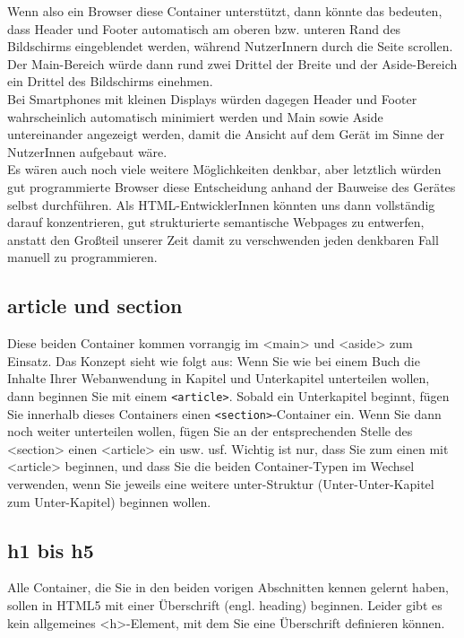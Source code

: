 Wenn also ein Browser diese Container unterstützt, dann könnte das bedeuten, dass Header und Footer automatisch am oberen bzw. unteren Rand des Bildschirms eingeblendet werden, während NutzerInnern durch die Seite scrollen. Der Main-Bereich würde dann rund zwei Drittel der Breite und der Aside-Bereich ein Drittel des Bildschirms einehmen.\\

Bei Smartphones mit kleinen Displays würden dagegen Header und Footer wahrscheinlich automatisch minimiert werden und Main sowie Aside untereinander angezeigt werden, damit die Ansicht auf dem Gerät im Sinne der NutzerInnen aufgebaut wäre.\\

Es wären auch noch viele weitere Möglichkeiten denkbar, aber letztlich würden gut programmierte Browser diese Entscheidung anhand der Bauweise des Gerätes selbst durchführen. Als HTML-EntwicklerInnen könnten uns dann vollständig darauf konzentrieren, gut strukturierte semantische Webpages zu entwerfen, anstatt den Großteil unserer Zeit damit zu verschwenden jeden denkbaren Fall manuell zu programmieren.

\subsection{article und section}

Diese beiden Container kommen vorrangig im <main> und <aside> zum Einsatz. Das Konzept sieht wie folgt aus: Wenn Sie wie bei einem Buch die Inhalte Ihrer Webanwendung in Kapitel und Unterkapitel unterteilen wollen, dann beginnen Sie mit einem \verb|<article>|. Sobald ein Unterkapitel beginnt, fügen Sie innerhalb dieses Containers einen \verb|<section>|-Container ein. Wenn Sie dann noch weiter unterteilen wollen, fügen Sie an der entsprechenden Stelle des <section> einen <article> ein usw. usf. Wichtig  ist nur, dass Sie zum einen mit <article> beginnen, und dass Sie die beiden Container-Typen im Wechsel verwenden, wenn Sie jeweils eine weitere unter-Struktur (Unter-Unter-Kapitel zum Unter-Kapitel) beginnen wollen.

\subsection{h1 bis h5}

Alle Container, die Sie in den beiden vorigen Abschnitten kennen gelernt haben, sollen in HTML5 mit einer Überschrift (engl. heading) beginnen. Leider gibt es kein allgemeines <h>-Element, mit dem Sie eine Überschrift definieren können.\\


